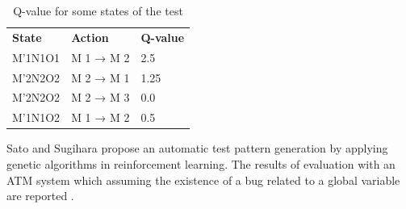 \begin{table}[h]
\centering
\caption{Q-value for some states of the test \cite{Piel2010}}
\label{tab:testq1}
\begin{tabular}{lll}
\rowcolor[HTML]{C0C0C0} 
\textbf{State} & \textbf{Action} & \textbf{Q-value} \\
M'1N1O1       & M 1 → M 2       & 2.5              \\
M'2N2O2       & M 2 → M 1       & 1.25             \\
M'2N2O2       & M 2 → M 3       & 0.0              \\
M'1N1O2       & M 1 → M 2       & 0.5             
\end{tabular}
\end{table}


Sato and Sugihara propose an automatic test pattern generation by applying genetic algorithms in reinforcement learning. The results of evaluation with an ATM system which assuming the existence of a bug related to a global variable are reported \cite{sato2015automatic}. 

